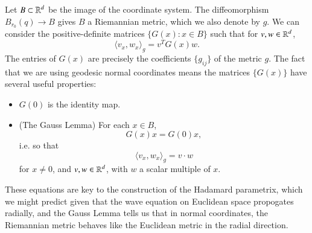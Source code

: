 Let $B \subset \operatorname{\mathbb{R}}^d$ be the image of the coordinate system. The diffeomorphism $B_{r_0}(q) \to B$ gives $B$ a Riemannian metric, which we also denote by $g$. We can consider the positive-definite matrices $\{ G(x) : x \in B \}$ such that for $v,w \in \operatorname{\mathbb{R}}^d$,
%
\[ \langle v_x, w_x \rangle_g = v^T G(x) w. \]
%
The entries of $G(x)$ are precisely the coefficients $\{ g_{ij} \}$ of the metric $g$. The fact that we are using geodesic normal coordinates means the matrices $\{ G(x) \}$ have several useful properties:
%
%
%
%
\begin{itemize}
    \item $G(0)$ is the identity map.

    \item (The Gauss Lemma) For each $x \in B$,
    \[ G(x) x = G(0) x, \]
    i.e. so that
    \[ \langle v_x, w_x \rangle_g = v \cdot w \]
    for $x \neq 0$, and $v,w \in \operatorname{\mathbb{R}}^d$, with $w$ a scalar multiple of $x$.
\end{itemize}
%
These equations are key to the construction of the Hadamard parametrix, which we might predict given that the wave equation on Euclidean space propogates radially, and the Gauss Lemma tells us that in normal coordinates, the Riemannian metric behaves like the Euclidean metric in the radial direction.

